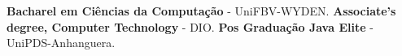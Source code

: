 %
%
%


\begin{scholarship}
					{\textbf{Bacharel em Ciências da Computação} - UniFBV-WYDEN.}
					{\textbf{Associate's degree, Computer Technology} - DIO.}
					{\textbf{Pos Graduação Java Elite} - UniPDS-Anhanguera.}
\end{scholarship}
